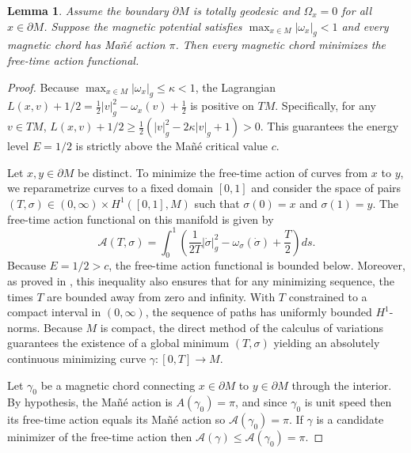 \documentclass[12pt]{amsart}
\numberwithin{equation}{section}
\newtheorem{lemma}[theorem]{Lemma}
\begin{document}
\begin{lemma} \label{lem:minimizing}
Assume the boundary $\partial M$ is totally geodesic and $\Omega_x = 0$ for all $x \in \partial M$. Suppose the magnetic potential satisfies $\max_{x \in M} |\omega_x|_g < 1$ and every magnetic chord has Ma\~n\'e action $\pi$. Then every magnetic chord minimizes the free-time action functional.\label{lemma4.14}
\end{lemma}

\begin{proof}
Because $\max_{x \in M} |\omega_x|_g \le \kappa < 1$, the Lagrangian $L(x,v) + 1/2 = \frac{1}{2}|v|_g^2 - \omega_x(v) + \frac{1}{2}$ is positive on $TM$. Specifically, for any $v \in TM$, $L(x,v) + 1/2 \ge \frac{1}{2}(|v|_g^2 - 2\kappa|v|_g + 1) > 0$. This guarantees the energy level $E = 1/2$ is strictly above the Ma\~n\'e critical value $c$.

Let $x, y \in \partial M$ be distinct. To minimize the free-time action of curves from $x$ to $y$, we reparametrize curves to a fixed domain $[0,1]$ and consider the space of pairs $(T, \sigma) \in (0, \infty) \times H^1([0,1], M)$ such that $\sigma(0) = x$ and $\sigma(1) = y$. The free-time action functional on this manifold is given by
\begin{equation}
   {\mathcal A}(T, \sigma) = \int_0^1 \left( \frac{1}{2T}|\dot{\sigma}|_g^2 - \omega_{\sigma}(\dot{\sigma}) + \frac{T}{2} \right) ds.
\end{equation}
Because $E = 1/2 > c$, the free-time action functional is bounded below. Moreover, as proved in \cite{CIPP}, this inequality also ensures that for any minimizing sequence, the times $T$ are bounded away from zero and infinity. With $T$ constrained to a compact interval in $(0, \infty)$, the sequence of paths has uniformly bounded $H^1$-norms. Because $M$ is compact, the direct method of the calculus of variations guarantees the existence of a global minimum $(T, \sigma)$ yielding an absolutely continuous minimizing curve $\gamma: [0, T] \to M$.

Let $\gamma_0$ be a magnetic chord connecting $x\in \partial M$ to $y\in \partial M$ through the interior. By hypothesis, the Ma\~n\'e action is $A(\gamma_0) = \pi$, and since $\gamma_0$ is unit speed then its free-time action equals its Ma\~n\'e action so ${\mathcal A}(\gamma_0) = \pi$. If $\gamma$ is a candidate minimizer of the free-time action then ${\mathcal A}(\gamma)\le {\mathcal A}(\gamma_0)=\pi$.


\end{proof}
\end{document}

